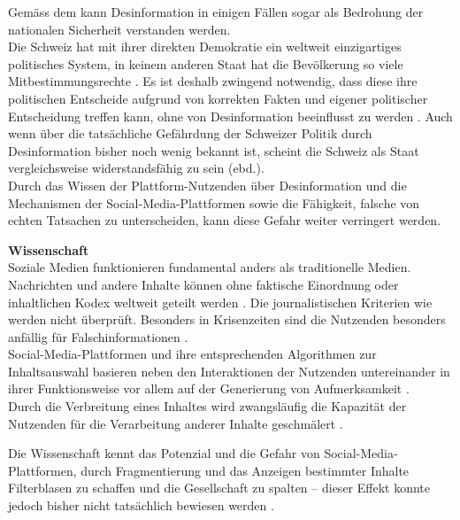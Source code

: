 \documentclass[12pt,a4paper]{article}        %
\begin{document}
Gemäss dem \textcites{bundesministerium_des_innern_und_fur_heimat_desinformation_2022}\parencite[zit.\ nach][15]{teetz_social-media-post_2023} kann Desinformation in einigen Fällen sogar als Bedrohung der nationalen Sicherheit verstanden werden. \\
Die Schweiz hat mit ihrer direkten Demokratie ein weltweit einzigartiges politisches System, in keinem anderen Staat hat die Bevölkerung so viele Mitbestimmungsrechte \parencite[2]{sager_politische_2017}. Es ist deshalb zwingend notwendig, dass diese ihre politischen Entscheide aufgrund von korrekten Fakten und eigener politischer Entscheidung treffen kann, ohne von Desinformation beeinflusst zu werden \parencite[26]{vogler_wahrnehmung_2021}\parencite[vgl.\ auch][14f]{european_parliament_directorate-general_for_external_policies_of_the_union_impact_2021}. Auch wenn über die tatsächliche Gefährdung der Schweizer Politik durch Desinformation bisher noch wenig bekannt ist, scheint die Schweiz als Staat vergleichsweise widerstandsfähig zu sein (ebd.).\\
Durch das Wissen der Plattform-Nutzenden über Desinformation und die Mechanismen der Social-Media-Plattformen sowie die Fähigkeit, falsche von echten Tatsachen zu unterscheiden, kann diese Gefahr weiter verringert werden.

\textbf{Wissenschaft} \\
Soziale Medien funktionieren fundamental anders als traditionelle Medien. Nachrichten und andere Inhalte können ohne faktische Einordnung oder inhaltlichen Kodex weltweit geteilt werden \parencite[211]{allcott_social_2017}. Die journalistischen Kriterien wie \parencite[9]{grujic_warnhinweise_2024} werden nicht überprüft. Besonders in Krisenzeiten sind die Nutzenden besonders anfällig für Falschinformationen \parencite[vgl.][2]{ceron_fake_2021}. \\
Social-Media-Plattformen und ihre entsprechenden Algorithmen zur Inhaltsauswahl basieren neben den Interaktionen der Nutzenden untereinander in ihrer Funktionsweise vor allem auf der Generierung von Aufmerksamkeit \parencites[vgl.][220]{schmidt_meinungsbildung_2022}[493]{behnke_manipulation_2018}. \\
Durch die Verbreitung eines Inhaltes wird zwangsläufig die Kapazität der Nutzenden für die Verarbeitung anderer Inhalte geschmälert \parencite[248]{hohlfeld_schlechte_2020}.

Die Wissenschaft kennt das Potenzial und die Gefahr von Social-Media-Plattformen, durch Fragmentierung und das Anzeigen bestimmter Inhalte Filterblasen zu schaffen und die Gesellschaft zu spalten – dieser Effekt konnte jedoch bisher nicht tatsächlich bewiesen werden \parencite[220]{schmidt_meinungsbildung_2022}.
\end{document}
